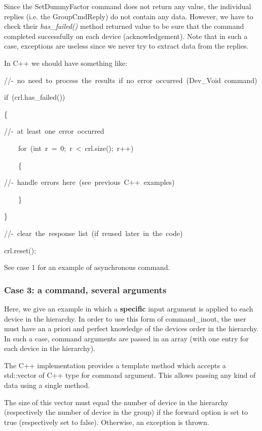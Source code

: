 Since the SetDummyFactor command does not return any value, the individual
replies (i.e. the GroupCmdReply) do not contain any data. However,
we have to check their \emph{has\_failed()} method
returned value to be sure that the command completed successfully
on each device (acknowledgement). Note that in such a case, exceptions
are useless since we never try to extract data from the replies. 

In C++ we should have something like: 


\begin{lyxcode}
//-~no~need~to~process~the~results~if~no~error~occurred~(Dev\_Void~command)

if~(crl.has\_failed())

\{

//-~at~least~one~error~occurred

~~~~for~(int~r~=~0;~r~<~crl.size();~r++)

~~~~\{

//-~handle~errors~here~(see~previous~C++~examples)

~~~~\}

\}

//-~clear~the~response~list~(if~reused~later~in~the~code)

crl.reset();
\end{lyxcode}


See case 1 for an example of asynchronous command.

\subsubsection{Case 3: a command, several arguments\label{subsec:Case-3}}

Here, we give an example in which a \textbf{specific} input argument
is applied to each device in the hierarchy. In order to use this form
of command\_inout, the user must have an \textquotedbl{}a
priori\textquotedbl{} and \textquotedbl{}perfect\textquotedbl{} knowledge
of the devices order in the hierarchy. In such a case, command arguments
are passed in an \textquotedbl{}array\textquotedbl{} (with one entry
for each device in the hierarchy).

The C++ implementation provides a template method which accepts a
std::vector of \textquotedbl{}C++ type for command argument\textquotedbl{}.
This allows passing any kind of data using a single method.

The size of this vector must equal the number of device in the hierarchy
(respectively the number of device in the group) if the forward
option is set to true (respectively set to false). Otherwise, an exception
is thrown.

